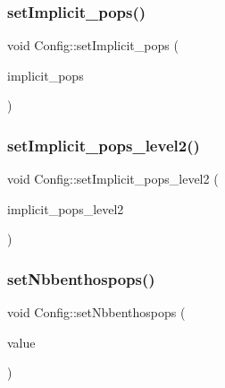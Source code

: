 \mbox{\label{class_config_aa8cb20d3adf8c13107a32f8add00e575}} 
\subsubsection{\texorpdfstring{setImplicit\_pops()}{setImplicit\_pops()}}
{\footnotesize\ttfamily void Config\+::set\+Implicit\+\_\+pops (\begin{DoxyParamCaption}\item[{const Q\+List$<$ int $>$ \&}]{implicit\+\_\+pops }\end{DoxyParamCaption})}

\mbox{\label{class_config_add968c3863cec6bc9c09266caefd2e5d}} 
\subsubsection{\texorpdfstring{setImplicit\_pops\_level2()}{setImplicit\_pops\_level2()}}
{\footnotesize\ttfamily void Config\+::set\+Implicit\+\_\+pops\+\_\+level2 (\begin{DoxyParamCaption}\item[{const Q\+List$<$ int $>$ \&}]{implicit\+\_\+pops\+\_\+level2 }\end{DoxyParamCaption})}

\mbox{\label{class_config_acd0bf6785354a69b37af0684e3d7bd8c}} 
\subsubsection{\texorpdfstring{setNbbenthospops()}{setNbbenthospops()}}
{\footnotesize\ttfamily void Config\+::set\+Nbbenthospops (\begin{DoxyParamCaption}\item[{int}]{value }\end{DoxyParamCaption})}

\mbox{\label{class_config_af0071bb155f7a9491a2c47383d827adf}} 
